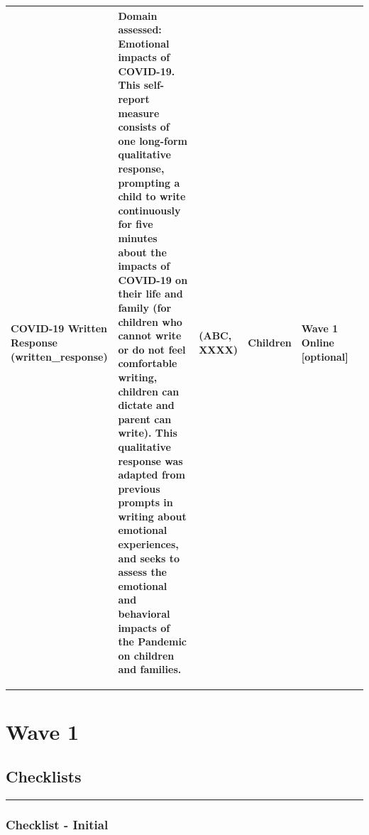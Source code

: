 \documentclass[]{book}
\begin{document}
\begin{longtable}[]{@{}llllll@{}}
\begin{minipage}[t]{0.18\columnwidth}
COVID-19 Written Response (written\_response)\strut
\end{minipage} & \begin{minipage}[t]{0.18\columnwidth}\raggedright
Domain assessed: Emotional impacts of COVID-19. This self-report measure consists of one long-form qualitative response, prompting a child to write continuously for five minutes about the impacts of COVID-19 on their life and family (for children who cannot write or do not feel comfortable writing, children can dictate and parent can write). This qualitative response was adapted from previous prompts in writing about emotional experiences, and seeks to assess the emotional and behavioral impacts of the Pandemic on children and families.\strut
\end{minipage} & \begin{minipage}[t]{0.15\columnwidth}\raggedright
(ABC, XXXX)\strut
\end{minipage} & \begin{minipage}[t]{0.16\columnwidth}\raggedright
Children\strut
\end{minipage} & \begin{minipage}[t]{0.06\columnwidth}\raggedright
Wave 1 Online {[}optional{]}\strut
\end{minipage} & \begin{minipage}[t]{0.10\columnwidth}\raggedright
\strut
\end{minipage}\tabularnewline
\bottomrule
\end{longtable}

\begin{center}\rule{0.5\linewidth}{0.5pt}\end{center}

\hypertarget{wave-1}{%
\chapter{Wave 1}\label{wave-1}}

\hypertarget{checklists}{%
\section{Checklists}\label{checklists}}

\begin{center}\rule{0.5\linewidth}{0.5pt}\end{center}

\hypertarget{checklist---initial}{%
\subsection{Checklist - Initial}\label{checklist---initial}}
\end{document}
